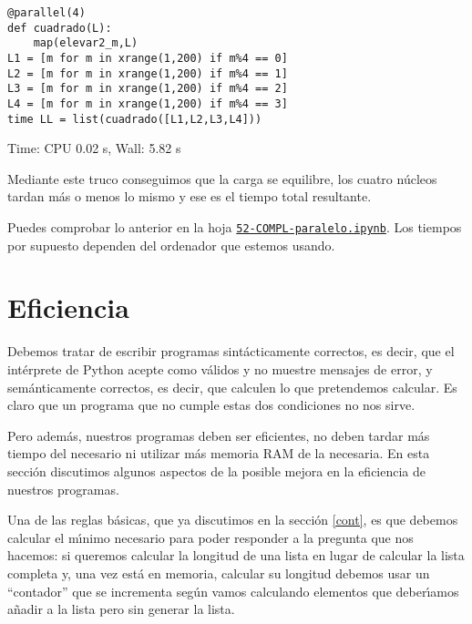 \begin{lstlisting}
@parallel(4)
def cuadrado(L):
	map(elevar2_m,L)
L1 = [m for m in xrange(1,200) if m%4 == 0]
L2 = [m for m in xrange(1,200) if m%4 == 1]
L3 = [m for m in xrange(1,200) if m%4 == 2]
L4 = [m for m in xrange(1,200) if m%4 == 3]
time LL = list(cuadrado([L1,L2,L3,L4]))
\end{lstlisting}
\begin{Output}
	Time: CPU 0.02 s, Wall: 5.82 s
\end{Output}

Mediante este truco conseguimos que la carga se equilibre, los cuatro n\'ucleos
tardan m\'as o menos lo mismo y ese es el tiempo total resultante. 

Puedes comprobar lo anterior  en la hoja 
\href{http://localhost:8888/notebooks/PROGR/COMPL/52-COMPL-paralelo.ipynb}{\tt 52-COMPL-paralelo.ipynb}. Los tiempos por supuesto dependen del ordenador que estemos usando.





\section{Eficiencia}

Debemos tratar de escribir programas {\sc sint\'acticamente correctos}, es
decir, que el int\'erprete de Python acepte como v\'alidos y no muestre mensajes
de error, y {\sc sem\'anticamente correctos}, es decir, que calculen lo que
pretendemos calcular. Es claro que un programa que no cumple estas dos
condiciones no nos sirve.


Pero adem\'as,  nuestros programas deben ser {\sc eficientes}, no deben tardar
m\'as tiempo
del necesario ni utilizar m\'as memoria RAM de la necesaria. En esta secci\'on
discutimos algunos aspectos de la posible mejora en la eficiencia de nuestros
programas.





Una de las  reglas b\'asicas, que ya discutimos en la secci\'on \ref{cont},  es
que {\sc debemos calcular el m\'{\i}nimo
necesario para poder responder}  a la pregunta que nos hacemos: si queremos
calcular la longitud
de una lista en lugar de calcular la lista completa y, una vez est\'a en
memoria, calcular su longitud debemos usar un ``contador'' que se incrementa
seg\'un vamos calculando elementos que deber\'{\i}amos a\~nadir a la lista pero
sin generar la lista. 

